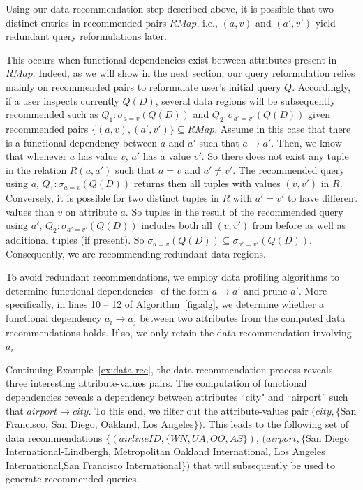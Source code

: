 Using our data recommendation step described above, it is possible that two distinct entries in recommended pairs $RMap$, i.e., $(a, v)$ and $(a', v')$ yield redundant query reformulations later.


This occurs when functional dependencies exist between attributes present in $RMap$. 
Indeed, as we will show in the next section, our query reformulation relies mainly on recommended pairs to reformulate user's initial query $Q$.
Accordingly, if a user inspects currently $Q(D)$, several data regions will be subsequently recommended  such as $Q_1: \sigma_{a=v}(Q(D))$ and $Q_2: \sigma_{a'=v'}(Q(D))$ given  recommended pairs $\{(a, v),(a', v')\} \subseteq RMap$.
Assume in this case that there is a functional dependency between $a$ and $a'$ such that $a \rightarrow a'$.
Then, we know that whenever $a$ has value $v$, $a'$ has a value $v'$. So there does not exist any tuple in the relation $R(a, a')$ such that $a = v$ and $a' \neq v'$. The recommended query using $a$, $Q_1: \sigma_{a=v}(Q(D))$  returns then all tuples with values $(v, v')$ in $R$. Conversely, it is possible for two distinct tuples in $R$ with $a' = v'$ to have different values than $v$ on attribute $a$. So tuples in the result of the recommended query using $a'$, $Q_2: \sigma_{a'=v'}(Q(D))$  includes both all $(v, v')$ from before as well as additional tuples (if present). So $\sigma_{a=v}(Q(D)) \subseteq \sigma_{a'=v'}(Q(D))$. 
Consequently, we are recommending redundant data regions.




To avoid redundant recommendations, we employ data profiling algorithms to determine functional dependencies~\cite{abedjan:vldbj15} of the form $a \rightarrow a'$ and prune $a'$. 
 More specifically, in lines 10 -- 12 of Algorithm~\ref{fig:alg}, we determine whether a functional dependency  $a_i \rightarrow a_j$ between two attributes from the computed data recommendations holds. If so, we only retain the data recommendation involving $a_i$.
 
  \sloppy

\begin{example}
\label{ex:data-rec-FD}
 Continuing Example~\ref{ex:data-rec}, the data recommendation process reveals three interesting attribute-values pairs. 
The computation of functional dependencies reveals a dependency between attributes ``city" and ``airport'' such that $airport \rightarrow city$. To this end, we filter out the attribute-values pair $(city,\{$San Francisco, San Diego, Oakland, Los Angeles$\})$. This leads to the following set of data recommendations $ \{(airlineID, \{WN,UA,OO,AS\})$, $(airport,\{$San Diego International-Lindbergh, Metropolitan Oakland International, Los Angeles International,San Francisco International$\} )$ that will subsequently be used to generate recommended queries.
 \end{example}




